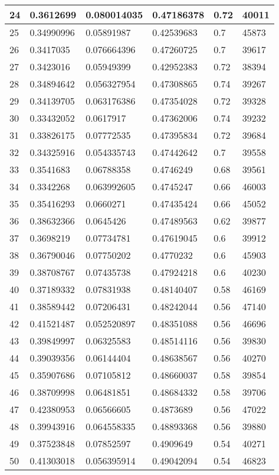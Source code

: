 \begin{longtable}{|l|l|l|l|l|l|}
24 & 0.3612699 & 0.080014035 & 0.47186378 & 0.72 & 40011 \\ \hline 
25 & 0.34990996 & 0.05891987 & 0.42539683 & 0.7 & 45873 \\ \hline 
26 & 0.3417035 & 0.076664396 & 0.47260725 & 0.7 & 39617 \\ \hline 
27 & 0.3423016 & 0.05949399 & 0.42952383 & 0.72 & 38394 \\ \hline 
28 & 0.34894642 & 0.056327954 & 0.47308865 & 0.74 & 39267 \\ \hline 
29 & 0.34139705 & 0.063176386 & 0.47354028 & 0.72 & 39328 \\ \hline 
30 & 0.33432052 & 0.0617917 & 0.47362006 & 0.74 & 39232 \\ \hline 
31 & 0.33826175 & 0.07772535 & 0.47395834 & 0.72 & 39684 \\ \hline 
32 & 0.34325916 & 0.054335743 & 0.47442642 & 0.7 & 39558 \\ \hline 
33 & 0.3541683 & 0.06788358 & 0.4746249 & 0.68 & 39561 \\ \hline 
34 & 0.3342268 & 0.063992605 & 0.4745247 & 0.66 & 46003 \\ \hline 
35 & 0.35416293 & 0.0660271 & 0.47435424 & 0.66 & 45052 \\ \hline 
36 & 0.38632366 & 0.0645426 & 0.47489563 & 0.62 & 39877 \\ \hline 
37 & 0.3698219 & 0.07734781 & 0.47619045 & 0.6 & 39912 \\ \hline 
38 & 0.36790046 & 0.07750202 & 0.4770232 & 0.6 & 45903 \\ \hline 
39 & 0.38708767 & 0.07435738 & 0.47924218 & 0.6 & 40230 \\ \hline 
40 & 0.37189332 & 0.07831938 & 0.48140407 & 0.58 & 46169 \\ \hline 
41 & 0.38589442 & 0.07206431 & 0.48242044 & 0.56 & 47140 \\ \hline 
42 & 0.41521487 & 0.052520897 & 0.48351088 & 0.56 & 46696 \\ \hline 
43 & 0.39849997 & 0.06325583 & 0.48514116 & 0.56 & 39830 \\ \hline 
44 & 0.39039356 & 0.06144404 & 0.48638567 & 0.56 & 40270 \\ \hline 
45 & 0.35907686 & 0.07105812 & 0.48660037 & 0.58 & 39854 \\ \hline 
46 & 0.38709998 & 0.06481851 & 0.48684332 & 0.58 & 39706 \\ \hline 
47 & 0.42380953 & 0.06566605 & 0.4873689 & 0.56 & 47022 \\ \hline 
48 & 0.39943916 & 0.064558335 & 0.48893368 & 0.56 & 39880 \\ \hline 
49 & 0.37523848 & 0.07852597 & 0.4909649 & 0.54 & 40271 \\ \hline 
50 & 0.41303018 & 0.056395914 & 0.49042094 & 0.54 & 46823 \\ \hline 
\end{longtable}
